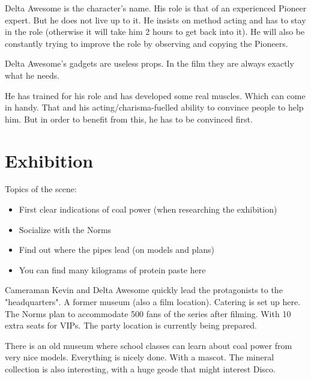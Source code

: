 \begin{npcBox}[title=Delta Awesome - acting the victim]
    \begin{consequences}
    \item {}
    \item {}
    \item {}
    \end{consequences}

    \begin{npcDescription}
    Delta Awesome is the character's name. His role is that of an experienced Pioneer expert. But he does not live up to it. He insists on method acting and has to stay in the role (otherwise it will take him 2 hours to get back into it). He will also be constantly trying to improve the role by observing and copying the Pioneers.

    Delta Awesome's gadgets are useless props. In the film they are always exactly what he needs.

    He has trained for his role and has developed some real muscles. Which can come in handy. That and his acting/charisma-fuelled ability to convince people to help him. But in order to benefit from this, he has to be convinced first.
    \end{npcDescription}

\end{npcBox}


\section{Exhibition}

Topics of the scene:
\begin{itemize}
\item First clear indications of coal power (when researching the exhibition)
\item Socialize with the Norms
\item Find out where the pipes lead (on models and plans)
\item You can find many kilograms of protein paste here
\end{itemize}


Cameraman Kevin and Delta Awesome quickly lead the protagonists to the "headquarters". A former museum (also a film location). Catering is set up here. The Norms plan to accommodate 500 fans of the series after filming. With 10 extra seats for VIPs. The party location is currently being prepared.

There is an old museum where school classes can learn about coal power from very nice models.
Everything is nicely done. With a mascot. The mineral collection is also interesting, with a huge geode that might interest Disco.

